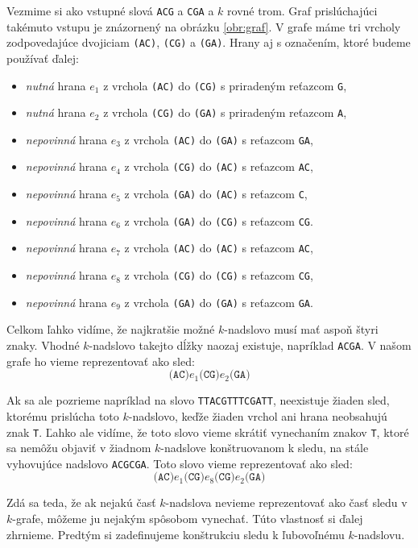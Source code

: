 Vezmime si ako vstupné slová \verb_ACG_ a \verb_CGA_ a $k$ rovné trom. Graf prislúchajúci
takémuto vstupu je znázornený na obrázku \ref{obr:graf}.
V grafe máme tri vrcholy zodpovedajúce dvojiciam \verb_(AC)_, \verb_(CG)_ a
\verb_(GA)_. Hrany aj s označením, ktoré budeme používať ďalej: 
\begin{itemize}
    \item \emph{nutná} hrana $e_1$ z vrchola \verb_(AC)_ do \verb_(CG)_ s priradeným reťazcom \verb_G_,
    \item \emph{nutná} hrana $e_2$ z vrchola \verb_(CG)_ do \verb_(GA)_ s priradeným reťazcom \verb_A_,
    \item \emph{nepovinná} hrana $e_3$ z vrchola \verb_(AC)_ do \verb_(GA)_ s reťazcom \verb_GA_,
    \item \emph{nepovinná} hrana $e_4$ z vrchola \verb_(CG)_ do \verb_(AC)_ s reťazcom \verb_AC_,
    \item \emph{nepovinná} hrana $e_5$ z vrchola \verb_(GA)_ do \verb_(AC)_ s reťazcom \verb_C_,
    \item \emph{nepovinná} hrana $e_6$ z vrchola \verb_(GA)_ do \verb_(CG)_ s reťazcom \verb_CG_.
    \item \emph{nepovinná} hrana $e_7$ z vrchola \verb_(AC)_ do \verb_(AC)_ s reťazcom \verb_AC_,
    \item \emph{nepovinná} hrana $e_8$ z vrchola \verb_(CG)_ do \verb_(CG)_ s reťazcom \verb_CG_,
    \item \emph{nepovinná} hrana $e_9$ z vrchola \verb_(GA)_ do \verb_(GA)_ s reťazcom \verb_GA_.
\end{itemize}

Celkom ľahko vidíme, že najkratšie možné $k$-nadslovo musí mať aspoň štyri znaky. Vhodné $k$-nadslovo takejto
dĺžky naozaj existuje, napríklad \verb_ACGA_. V našom grafe ho vieme reprezentovať ako sled:
$$\texttt{(AC)} e_1 \texttt{(CG)} e_2 \texttt{(GA)}$$

Ak sa ale pozrieme napríklad na slovo \verb_TTACGTTTCGATT_, neexistuje žiaden sled, ktorému prislúcha toto $k$-nadslovo,
keďže žiaden vrchol ani hrana neobsahujú znak \verb_T_. Ľahko ale vidíme, že toto slovo vieme skrátiť
vynechaním znakov \verb_T_, ktoré sa nemôžu objaviť v žiadnom $k$-nadslove konštruovanom k sledu,
na stále vyhovujúce nadslovo \verb_ACGCGA_. Toto slovo vieme reprezentovať ako sled:
$$\texttt{(AC)} e_1 \texttt{(CG)} e_8 \texttt{(CG)} e_2 \texttt{(GA)}$$

Zdá sa teda, že ak nejakú časť $k$-nadslova nevieme reprezentovať ako časť sledu v $k$-grafe, môžeme ju
nejakým spôsobom vynechať. Túto vlastnosť si ďalej zhrnieme. Predtým si zadefinujeme konštrukciu sledu k
ľubovoľnému $k$-nadslovu.

